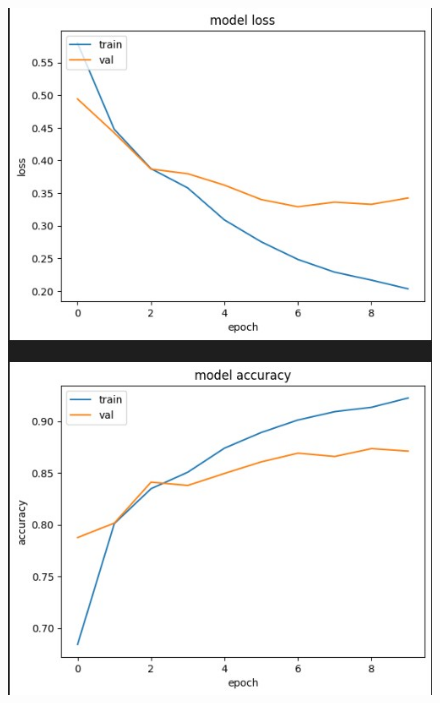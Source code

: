 \documentclass{article}
\begin{document}
\begin{figure}[!h]
    \centering\includegraphics[scale=.65]{./GRU-[16]-[64, 16, 16]}
    \caption{}\label{fig.48}
\end{figure}
\end{document}
